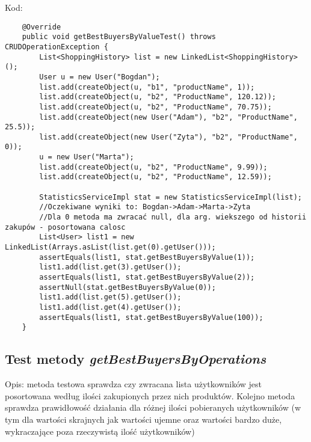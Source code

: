 \documentclass[a4paper,11pt,notitlepage]{article}
\begin{document}
Kod:
\begin{footnotesize}\begin{verbatim}
    @Override
    public void getBestBuyersByValueTest() throws CRUDOperationException {
        List<ShoppingHistory> list = new LinkedList<ShoppingHistory>();
        User u = new User("Bogdan");
        list.add(createObject(u, "b1", "productName", 1));
        list.add(createObject(u, "b2", "ProductName", 120.12));
        list.add(createObject(u, "b2", "ProductName", 70.75));
        list.add(createObject(new User("Adam"), "b2", "ProductName", 25.5));
        list.add(createObject(new User("Zyta"), "b2", "ProductName", 0));
        u = new User("Marta");
        list.add(createObject(u, "b2", "ProductName", 9.99));
        list.add(createObject(u, "b2", "ProductName", 12.59));

        StatisticsServiceImpl stat = new StatisticsServiceImpl(list);
        //Oczekiwane wyniki to: Bogdan->Adam->Marta->Zyta
        //Dla 0 metoda ma zwracać null, dla arg. wiekszego od historii zakupów - posortowana calosc
        List<User> list1 = new LinkedList(Arrays.asList(list.get(0).getUser()));
        assertEquals(list1, stat.getBestBuyersByValue(1));
        list1.add(list.get(3).getUser());
        assertEquals(list1, stat.getBestBuyersByValue(2));
        assertNull(stat.getBestBuyersByValue(0));
        list1.add(list.get(5).getUser());
        list1.add(list.get(4).getUser());
        assertEquals(list1, stat.getBestBuyersByValue(100));
    }
\end{verbatim}\end{footnotesize}

\subsection{Test metody \textit{getBestBuyersByOperations}}

Opis: metoda testowa sprawdza czy zwracana lista użytkowników jest posortowana według ilości zakupionych przez nich produktów. Kolejno metoda sprawdza prawidłowość działania dla różnej ilości pobieranych użytkowników (w tym dla wartości skrajnych jak wartości ujemne oraz wartości bardzo duże, wykraczające poza rzeczywistą ilość użytkowników)
\end{document}
